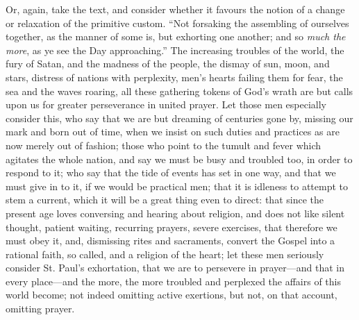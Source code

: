 Or, again, take the text, and consider whether it favours the
notion of a change or relaxation of the primitive custom. ``Not
forsaking the assembling of ourselves together, as the manner of some
is, but exhorting one another; and so \emph{much the more}, as ye see
the Day approaching.'' The increasing troubles of the world, the
fury of Satan, and the madness of the people, the dismay of sun, moon,
and stars, distress of nations with perplexity, men's hearts failing
them for fear, the sea and the waves roaring, all these gathering
tokens of God's wrath are but calls upon us for greater perseverance
in united prayer. Let those men especially consider this, who say that
we are but dreaming of centuries gone by, missing our mark and born
out of time, when we insist on such duties and practices as are now
merely out of fashion; those who point to the tumult and fever which
agitates the whole nation, and say we must be busy and troubled too,
in order to respond to it; who say that the tide of events has set in
one way, and that we must give in to it, if we would be practical men;
that it is idleness to attempt to stem a current, which it will be a
great thing even to direct: that since the present age loves
conversing and hearing about religion, and does not like silent
thought, patient waiting, recurring prayers, severe exercises, that
therefore we must obey it, and, dismissing rites and sacraments,
convert the Gospel into a rational faith, so called, and a religion of
the heart; let these men seriously consider St. Paul's exhortation,
that we are to persevere in prayer—and that in every place—and the
more, the more troubled and perplexed the affairs of this world
become; not indeed omitting active exertions, but not, on that
account, omitting prayer.

